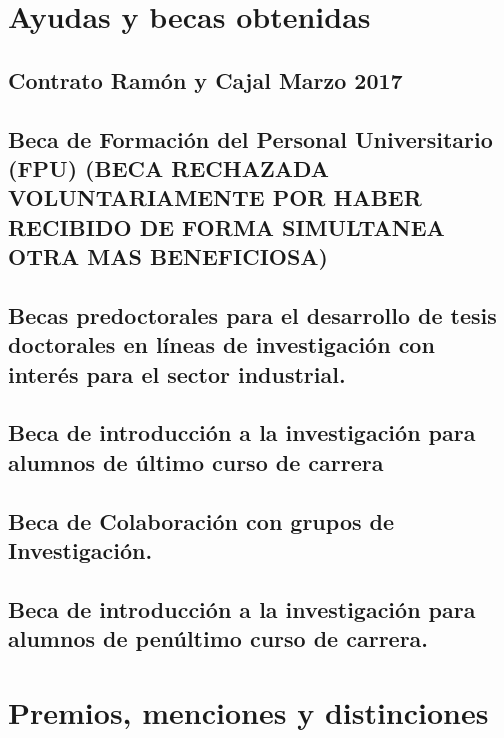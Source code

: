 \documentclass[a4paper, 11pt, twoside, openright]{report}
\begin{document}
\section{Ayudas y becas obtenidas}
\subsection{Contrato Ramón y Cajal Marzo 2017}

\subsection{Beca de Formación del Personal Universitario (FPU) (BECA RECHAZADA VOLUNTARIAMENTE POR HABER RECIBIDO DE FORMA SIMULTANEA OTRA MAS BENEFICIOSA)}

\subsection{Becas predoctorales para el desarrollo de tesis doctorales en líneas de investigación con interés para el sector industrial.}

\subsection{Beca de introducción a la investigación para alumnos de último curso de carrera}

\subsection{Beca de Colaboración con grupos de Investigación.}

\subsection{Beca de introducción a la investigación para alumnos de penúltimo curso de carrera.}



\section{Premios, menciones y distinciones}
\end{document}
